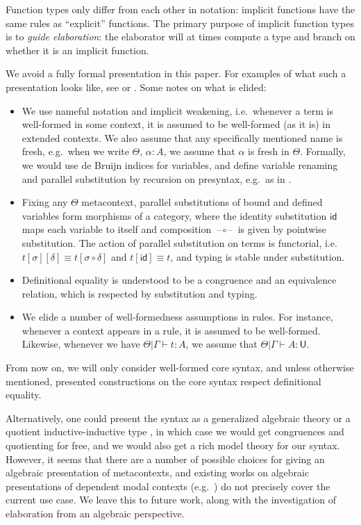 \documentclass[acmsmall,review,anonymous,prologue,dvipsnames]{acmart}\settopmatter{printfolios=true,printccs=false,printacmref=false}
\renewcommand{\U}{\mathsf{U}}
\newcommand{\id}{\mathsf{id}}
\newcommand{\blank}{\mathord{\hspace{1pt}\text{--}\hspace{1pt}}}
\theoremstyle{remark}
\begin{document}
Function types only differ from each other in notation: implicit
functions have the same rules as ``explicit'' functions. The primary purpose of
implicit function types is to \emph{guide elaboration}: the elaborator will at
times compute a type and branch on whether it is an implicit function.

We avoid a fully formal presentation in this paper. For examples of what such a
presentation looks like, see \cite{decidableconv} or \cite{coqnbe}. Some notes
on what is elided:
\begin{itemize}
  \item We use nameful notation and implicit weakening, i.e.\ whenever a term is
    well-formed in some context, it is assumed to be well-formed (as it is) in
    extended contexts. We also assume that any specifically mentioned name is
    fresh, e.g.\ when we write $\Theta,\,\alpha : A$, we assume that $\alpha$ is
    fresh in $\Theta$.  Formally, we would use de Bruijn indices for variables,
    and define variable renaming and parallel substitution by recursion on
    presyntax, e.g.\ as in \cite{autosubst}.
  \item Fixing any $\Theta$ metacontext, parallel substitutions of bound and
    defined variables form morphisms of a category, where the identity
    substitution $\id$ maps each variable to itself and composition
    $\blank\circ\blank$ is given by pointwise substitution. The action of
    parallel substitution on terms is functorial, i.e.\ $t[\sigma][\delta]
    \equiv t[\sigma\circ\delta]$ and $t[\id] \equiv t$, and typing is stable
    under substitution.
  \item
    Definitional equality is understood to be a congruence and an equivalence relation,
    which is respected by substitution and typing.
  \item
    We elide a number of well-formedness assumptions in rules. For instance, whenever
    a context appears in a rule, it is assumed to be well-formed. Likewise, whenever
    we have $\Theta|\Gamma\vdash t : A$, we assume that $\Theta|\Gamma\vdash A : \U$.
\end{itemize}

From now on, we will only consider well-formed core syntax, and unless otherwise
mentioned, presented constructions on the core syntax respect definitional
equality.

Alternatively, one could present the syntax as a generalized algebraic theory
\cite{sterling2019algebraic} or a quotient inductive-inductive type
\cite{ttintt}, in which case we would get congruences and quotienting for free,
and we would also get a rich model theory for our syntax. However, it seems that
there are a number of possible choices for giving an algebraic presentation of
metacontexts, and existing works on algebraic presentations of dependent modal
contexts (e.g.\ \cite{dependentrightadjoints}) do not precisely cover the current use
case. We leave this to future work, along with the investigation of elaboration
from an algebraic perspective.
\end{document}

